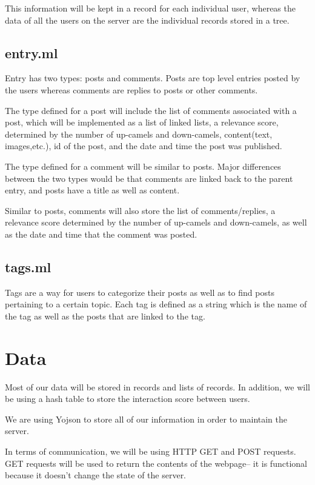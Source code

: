 \documentclass[11pt]{article}
\begin{document}
This information will be kept in a record for each individual user, whereas the data of all the users on the server are the individual records stored in a tree. 

\subsection{entry.ml}
Entry has two types: posts and comments. Posts are top level entries posted by the users whereas comments are replies to posts or other comments. 

The type defined for a post will include the list of comments associated with a post, which will be implemented as a list of linked lists, a relevance score, determined by the number of up-camels and down-camels, content(text, images,etc.), id of the post, and the date and time the post was published.

The type defined for a comment will be similar to posts. Major differences between the two types would be that comments are linked back to the parent entry, and posts have a title as well as content.

Similar to posts, comments will also store the list of comments/replies, a relevance score determined by the number of up-camels and down-camels, as well as the date and time that the comment was posted. 

\subsection{tags.ml}
Tags are a way for users to categorize their posts as well as to find posts pertaining to a certain topic. Each tag is defined as a string which is the name of the tag as well as the posts that are linked to the tag. 

\section{Data}

Most of our data will be stored in records and lists of records. In addition, we will be using a hash table to store the interaction score between users. 

We are using Yojson to store all of our information in order to maintain the server. 

In terms of communication, we will be using HTTP GET and POST requests. GET requests will be used to return the contents of the webpage-- it is functional because it doesn’t change the state of the server.
\end{document}

